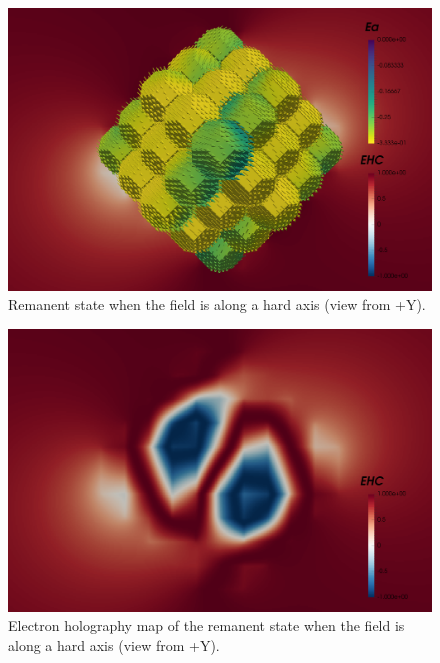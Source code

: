 \begin{figure}
\centering
\includegraphics[width=\textwidth]{research-4/figs/fram_i16_f0_-y.png}
\caption[Remanent state when the field is along a hard axis (view from +Y)]{Remanent state when the field is along a hard axis (view from +Y).}
\label{FIG_23}
\end{figure}

\begin{figure}
\centering
\includegraphics[width=\textwidth]{research-4/figs/fram_i16_f0_-y_EHC.png}
\caption[Electron holography map of the remanent state when the field is along a hard axis (view from +Y)]{Electron holography map of the remanent state when the field is along a hard axis (view from +Y).}
\label{FIG_24}
\end{figure}

